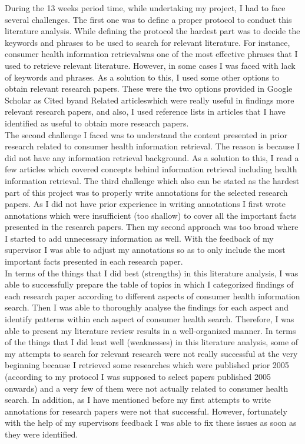 \documentclass[]{article}
\begin{document}
During the 13 weeks period time, while undertaking my project, I had to face several challenges. The first one was to define a proper protocol to conduct this literature analysis. While defining the protocol the hardest part was to decide the keywords and phrases to be used to search for relevant literature. For instance, \textquotesingle consumer health information retrieval\textquotesingle was one of the most effective phrases that I used to retrieve relevant literature. However, in some cases I was faced with lack of keywords and phrases. As a solution to this, I used some other options to obtain relevant research papers. These were the two options provided in Google Scholar as \textquotesingle Cited by\textquotesingle and \textquotesingle Related articles\textquotesingle which were really useful in findings more relevant research papers, and also, I used reference lists in articles that I have identified as useful to obtain more research papers. \\
  
The second challenge I faced was to understand the content presented in prior research related to consumer health information retrieval. The reason is because I did not have any information retrieval background. As a solution to this, I read a few articles which covered concepts behind information retrieval including health information retrieval. The third challenge which also can be stated as the hardest part of this project was to properly write annotations for the selected research papers. As I did not have prior experience in writing annotations I first wrote annotations which were insufficient (too shallow) to cover all the important facts presented in the research papers. Then my second approach was too broad where I started to add unnecessary information as well. With the feedback of my supervisor I was able to adjust my annotations so as to only include the most important facts presented in each research paper.  \\
   
In terms of the things that I did best (strengths) in this literature analysis, I was able to successfully prepare the table of topics in which I categorized findings of each research paper according to different aspects of consumer health information search. Then I was able to thoroughly analyse the findings for each aspect and identify patterns within each aspect of consumer health search. Therefore, I was able to present my literature review results in a well-organized manner. In terms of the things that I did least well (weaknesses) in this literature analysis, some of my attempts to search for relevant research were not really successful at the very beginning because I retrieved some researches which were published prior 2005 (according to my protocol I was supposed to select papers published 2005 onwards) and a very few of them were not actually related to consumer health search. In addition, as I have mentioned before my first attempts to write annotations for research papers were not that successful. However, fortunately with the help of my supervisor\textquotesingle s feedback I was able to fix these issues as soon as they were identified. \\ 
    
\end{document}

